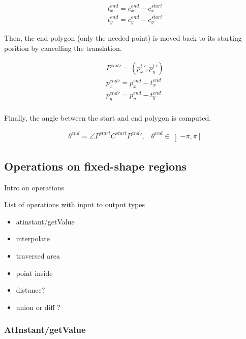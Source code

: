 	\begin{equation}
	\begin{split}
		& t_x^{end} = c_x^{end} - c_x^{start} \\
		& t_y^{end} = c_y^{end} - c_y^{start}
	\end{split}
	\end{equation}

	Then, the end polygon (only the needed point) is moved back to its starting position by cancelling the translation.


	\begin{equation}
	\begin{split}
		& {P^{end}}' = ({p_{x}^{i}}', {p_{y}^{i}}') \\
		& {p_x^{end}}' = p_x^{end} - t_x^{end} \\
		& {p_y^{end}}' = p_y^{end} - t_y^{end} \\
	\end{split}
	\end{equation}

	Finally, the angle between the start and end polygon is computed.

	\begin{equation}
	\begin{split}
		& \theta^{end} = \angle P^{start} C^{start} {P^{end}}' , \; \; \; \theta^{end} \in \left ] - \pi , \pi \right ]
	\end{split}
	\end{equation}

	\subsection{Operations on fixed-shape regions}

	Intro on operations

	List of operations with input to output types

	\begin{itemize}
		\item atinstant/getValue
		\item interpolate
		\item traversed area
		\item point inside
		\item distance?
		\item union or diff ?
	\end{itemize}

		\subsubsection{AtInstant/getValue}
		
